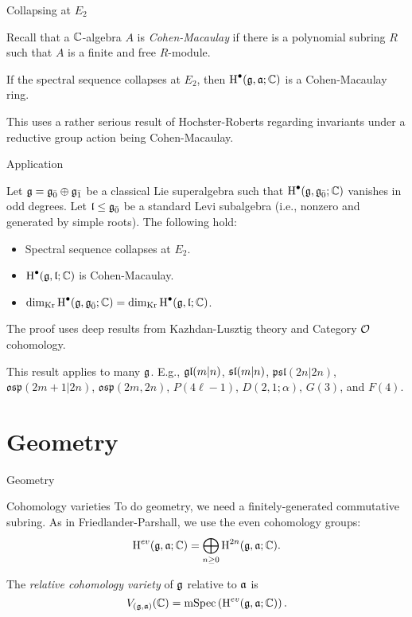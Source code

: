 \documentclass{beamer}
\newcommand{\sectionframe}[1]{\begin{frame}\begin{center}{\Huge #1 }\end{center}\end{frame}}
\begin{document}
\begin{frame}{Collapsing at $E_2$}\pause
  \begin{definition}
    Recall that a $\CC$-algebra $A$ is \emph{Cohen-Macaulay} if there is a polynomial subring $R$ such that $A$ is a finite and free $R$-module.
  \end{definition}
  \pause
  \begin{theorem}
   If the spectral sequence collapses at $E_2$, then $\H^\bullet(\g,\a;\CC)$ is a Cohen-Macaulay ring.
  \end{theorem}
 \pause
   This uses a rather serious result of Hochster-Roberts regarding invariants under a reductive group action being Cohen-Macaulay.
\end{frame}

\begin{frame}{Application}\pause
  \begin{theorem}
    Let $\g = \even{\g} \oplus \odd{\g}$ be a classical Lie superalgebra such that $\H^\bullet(\g,\even{\g};\CC)$ vanishes in odd degrees. Let $\l \leq \even{\g}$ be a standard Levi subalgebra (i.e., nonzero and generated by simple roots). The following hold:
    \begin{itemize}
    \pause\item Spectral sequence collapses at $E_2$.
    \pause\item $\H^\bullet(\g,\l;\CC)$ is Cohen-Macaulay.
    \pause\item $\kdim \H^\bullet(\g,\even{\g};\CC) = \kdim \H^\bullet(\g,\l;\CC)$.
    \end{itemize}
  \end{theorem}
  
  \pause The proof uses deep results from Kazhdan-Lusztig theory and Category $\O$ cohomology.

  \pause
\begin{example}
  This result applies to many $\g$. E.g., $\gl(m|n)$, $\sl(m|n)$, $\mathfrak{psl}(2n|2n)$, $\mathfrak{osp}(2m+1|2n)$, $\mathfrak{osp}(2m,2n)$, $P(4\ell - 1)$, $D(2,1;\alpha)$, $G(3)$, and $F(4)$.
\end{example}
\end{frame}

\section{Geometry}
\sectionframe{Geometry}

\begin{frame}{Cohomology varieties} \pause
  To do geometry, we need a finitely-generated commutative subring. As in Friedlander-Parshall, we use the even cohomology groups:
  \[
    \H^{ev}(\g,\a;\CC) = \bigoplus_{n \geq 0} \H^{2n}(\g,\a;\CC).
  \]
  \pause
  \begin{definition}
    The \emph{relative cohomology variety} of $\g$ relative to $\a$ is
    \[
      V_{(\g,\a)}(\CC) = \maxspec\left(\H^{ev}(\g,\a;\CC)\right).
    \]
    
  \end{definition}
\end{frame}
\end{document}
